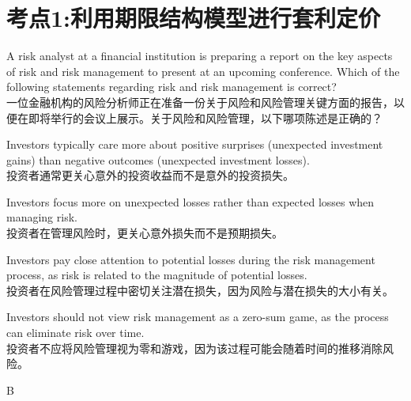 \documentclass{article}
\newcounter{question} %
\begin{document}
 \tableofcontents %
\newpage




\section{考点1:利用期限结构模型进行套利定价}
\setcounter{question}{0}


\begin{question}
    A risk analyst at a financial institution is preparing a report on the key aspects of risk and risk management to present at an upcoming conference. Which of the following statements regarding risk and risk management is correct?\\
    一位金融机构的风险分析师正在准备一份关于风险和风险管理关键方面的报告，以便在即将举行的会议上展示。关于风险和风险管理，以下哪项陈述是正确的？
\end{question}

\begin{choices}
    \item Investors typically care more about positive surprises (unexpected investment gains) than negative outcomes (unexpected investment losses).\\
    投资者通常更关心意外的投资收益而不是意外的投资损失。
    
    \item Investors focus more on unexpected losses rather than expected losses when managing risk.\\
    投资者在管理风险时，更关心意外损失而不是预期损失。
    
    \item Investors pay close attention to potential losses during the risk management process, as risk is related to the magnitude of potential losses.\\
    投资者在风险管理过程中密切关注潜在损失，因为风险与潜在损失的大小有关。
    
    \item Investors should not view risk management as a zero-sum game, as the process can eliminate risk over time.\\
    投资者不应将风险管理视为零和游戏，因为该过程可能会随着时间的推移消除风险。
\end{choices}

\begin{correctanswer}
    B
\end{correctanswer}
\end{document}
